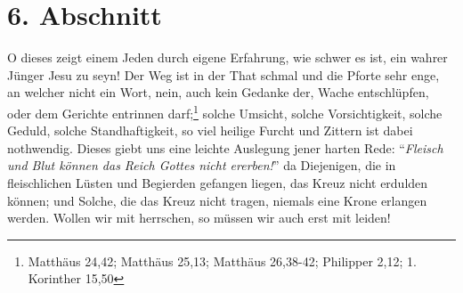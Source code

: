 \section{6. Abschnitt} \label{kap3_ab6} 

O dieses zeigt einem Jeden durch eigene Erfahrung, wie schwer es ist, ein wahrer
Jünger Jesu zu seyn! Der Weg ist in der That schmal und die Pforte sehr enge, an
welcher nicht ein Wort, nein, auch kein Gedanke der, Wache entschlüpfen, oder
dem Gerichte entrinnen darf;\footnote{Matthäus 24,42; Matthäus 25,13; Matthäus 26,38-42;
Philipper 2,12; 1. Korinther 15,50} solche Umsicht, solche Vorsichtigkeit, solche Geduld,
solche Standhaftigkeit, so viel heilige Furcht und Zittern ist dabei nothwendig.
Dieses giebt uns eine leichte Auslegung jener harten Rede: "`\textit{Fleisch und Blut
können das Reich Gottes nicht ererben!}"' da Diejenigen, die in fleischlichen
Lüsten und Begierden gefangen liegen, das Kreuz nicht erdulden können; und
Solche, die das Kreuz nicht tragen, niemals eine Krone erlangen werden. Wollen
wir mit herrschen, so müssen wir auch erst mit leiden!

